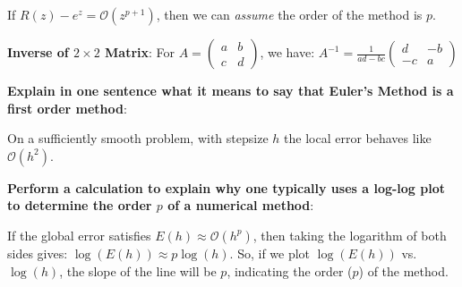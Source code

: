\documentclass[9pt]{article}
\begin{document}
If $R(z)-e^z=\mathcal{O}(z^{p+1})$, then we can \textit{assume} the order of the method is $p$.

\newpage

\textbf{Inverse of $2\times2$ Matrix}: {\small For $A=\begin{pmatrix} a & b \\ c & d \end{pmatrix}$, we have: $A^{-1}=\frac{1}{ad-bc}\begin{pmatrix} d & -b \\ -c & a \end{pmatrix}$}

\textbf{Explain in one sentence what it means to say that Euler's Method is a first order method}:

On a sufficiently smooth problem, with stepsize $h$ the local error behaves like $\mathcal{O}(h^2)$.

\textbf{Perform a calculation to explain why one typically uses a log-log plot to determine the order $p$ of a numerical method}:

If the global error satisfies $E(h)\approx\mathcal{O}(h^p)$, then taking the logarithm of both sides gives: $\log(E(h))\approx p\log(h)$. So, if we plot $\log(E(h))$ vs. $\log(h)$, the slope of the line will be $p$, indicating the order ($p$) of the method.
\end{document}

